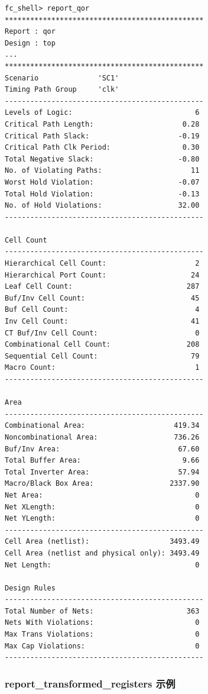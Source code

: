 \begin{lstlisting}
fc_shell> report_qor
***********************************************
Report : qor
Design : top
...
***********************************************
Scenario              'SC1'
Timing Path Group     'clk'
-----------------------------------------------
Levels of Logic:                             6
Critical Path Length:                     0.28
Critical Path Slack:                     -0.19
Critical Path Clk Period:                 0.30
Total Negative Slack:                    -0.80
No. of Violating Paths:                     11
Worst Hold Violation:                    -0.07
Total Hold Violation:                    -0.13
No. of Hold Violations:                  32.00
-----------------------------------------------

Cell Count
-----------------------------------------------
Hierarchical Cell Count:                     2
Hierarchical Port Count:                    24
Leaf Cell Count:                           287
Buf/Inv Cell Count:                         45
Buf Cell Count:                              4
Inv Cell Count:                             41
CT Buf/Inv Cell Count:                       0
Combinational Cell Count:                  208
Sequential Cell Count:                      79
Macro Count:                                 1
-----------------------------------------------

Area
-----------------------------------------------
Combinational Area:                     419.34
Noncombinational Area:                  736.26
Buf/Inv Area:                            67.60
Total Buffer Area:                        9.66
Total Inverter Area:                     57.94
Macro/Black Box Area:                  2337.90
Net Area:                                    0
Net XLength:                                 0
Net YLength:                                 0
-----------------------------------------------
Cell Area (netlist):                   3493.49
Cell Area (netlist and physical only): 3493.49
Net Length:                                  0

Design Rules
-----------------------------------------------
Total Number of Nets:                      363
Nets With Violations:                        0
Max Trans Violations:                        0
Max Cap Violations:                          0
-----------------------------------------------
\end{lstlisting}

\subsubsection{report\_transformed\_registers 示例}
